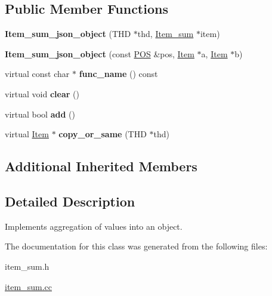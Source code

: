 \subsection*{Public Member Functions}
\begin{DoxyCompactItemize}
\item 
\mbox{\label{classItem__sum__json__object_a6a6a55dfea1a3197380e5397612b857f}} 
{\bfseries Item\+\_\+sum\+\_\+json\+\_\+object} (T\+HD $\ast$thd, \mbox{\hyperlink{classItem__sum}{Item\+\_\+sum}} $\ast$item)
\item 
\mbox{\label{classItem__sum__json__object_a3d35f61dd6fc1a0cfc3152a9e2c15605}} 
{\bfseries Item\+\_\+sum\+\_\+json\+\_\+object} (const \mbox{\hyperlink{structYYLTYPE}{P\+OS}} \&pos, \mbox{\hyperlink{classItem}{Item}} $\ast$a, \mbox{\hyperlink{classItem}{Item}} $\ast$b)
\item 
\mbox{\label{classItem__sum__json__object_a4d316f5c6da782bed77f99ef20e6e0a8}} 
virtual const char $\ast$ {\bfseries func\+\_\+name} () const
\item 
\mbox{\label{classItem__sum__json__object_ac9fd26647e70307463cecde4e2021dcb}} 
virtual void {\bfseries clear} ()
\item 
\mbox{\label{classItem__sum__json__object_ac2dded7aff02ec719cf4dc841d3101d3}} 
virtual bool {\bfseries add} ()
\item 
\mbox{\label{classItem__sum__json__object_a20f7c8f625850eca90957aebd4ff002b}} 
virtual \mbox{\hyperlink{classItem}{Item}} $\ast$ {\bfseries copy\+\_\+or\+\_\+same} (T\+HD $\ast$thd)
\end{DoxyCompactItemize}
\subsection*{Additional Inherited Members}


\subsection{Detailed Description}
Implements aggregation of values into an object. 

The documentation for this class was generated from the following files\+:\begin{DoxyCompactItemize}
\item 
item\+\_\+sum.\+h\item 
\mbox{\hyperlink{item__sum_8cc}{item\+\_\+sum.\+cc}}\end{DoxyCompactItemize}

